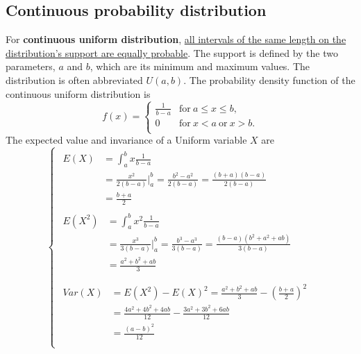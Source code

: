 \documentclass[10pt,onecolumn]{book}
\begin{document}
\subsection{Continuous probability distribution}
For \textbf{continuous uniform distribution}, \uline{all intervals of the same length on the distribution's support are equally probable}. The support is defined by the two parameters, $a$ and $b$, which are its minimum and maximum values. The distribution is often abbreviated $U(a, b)$. The probability density function of the continuous uniform distribution is 
\begin{equation}
f(x)=
\left\{
	\begin{array}{ll}
		\frac{1}{b - a}  & \mathrm{for} \ a \le x \le b,  \\
		0                & \mathrm{for} \ x < a \ \mathrm{or} \ x > b. \\
	\end{array}
\right.
\end{equation}
The expected value and invariance of a Uniform variable $X$ are
\begin{equation}
\left\{
	\begin{array}{lr}
	\begin{split}
	E(X)  & = \int_{a}^{b} x \frac{1}{b - a} \\
		  & = \frac{x^2}{2(b - a)}\bigg|_{a}^b = \frac{b^2 - a^2}{2(b - a)} = \frac{(b + a)(b - a)}{2(b - a)} \\
		  & = \frac{b + a}{2}
	\end{split} \\
	\begin{split}
	E(X^2) & = \int_{a}^{b} x^2 \frac{1}{b - a} \\
		   & = \frac{x^3}{3(b - a)}\bigg|_{a}^b = \frac{b^3 - a^3}{3(b - a)} = \frac{(b - a)(b ^ 2 + a ^ 2 + ab)}{3(b - a)} \\
		   & = \frac{a ^ 2 + b ^ 2 + ab}{3} \\
	\end{split} \\
	\begin{split}
	Var(X) & = E(X^2) - E(X)^2 
		     = \frac{a ^ 2 + b ^ 2 + ab}{3} - (\frac{b + a}{2})^2 \\
		   & = \frac{4a ^ 2 + 4b ^ 2 + 4ab}{12} - \frac{3a^2 + 3b^2 + 6ab}{12} \\
		   & = \frac{(a - b)^2}{12}
	\end{split}  \\
	\end{array}
\right.
\end{equation}
\end{document}
